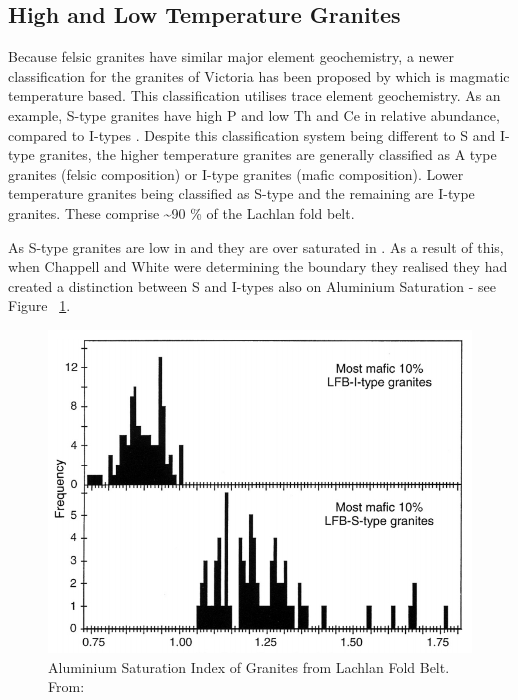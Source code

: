 \documentclass[a4paper]{article}
\begin{document}
\subsection{High and Low Temperature Granites}
Because felsic granites have similar major element geochemistry, a newer classification for the granites of Victoria has been proposed by \cite{chappell2010high} which is magmatic temperature based. This classification utilises trace element geochemistry. As an example, S-type granites have high P and low Th and Ce in relative abundance, compared to I-types \cite{chappell1998high}. Despite this classification system being different to S and I-type granites, the higher temperature granites are generally classified as A type granites (felsic composition) or I-type granites (mafic composition). Lower temperature granites being classified as S-type and the remaining are I-type granites. These comprise \textasciitilde 90 \% of the Lachlan fold belt. \cite{chappell2001two}

As S-type granites are low in  and  they are over saturated in . As a result of this, when Chappell and White were determining the boundary they realised they had created a distinction between S and I-types also on Aluminium Saturation - see Figure  ~\ref{fig:AluminiumSaturationIndex}.

\begin{figure}[H]
\centering
\includegraphics[width=1\textwidth]{Aluminium_Saturation_Index.jpg}
\caption{\label{fig:AluminiumSaturationIndex}Aluminium Saturation Index of Granites from Lachlan Fold Belt. From: \cite{chappell1998high}}
\end{figure}
\end{document}
